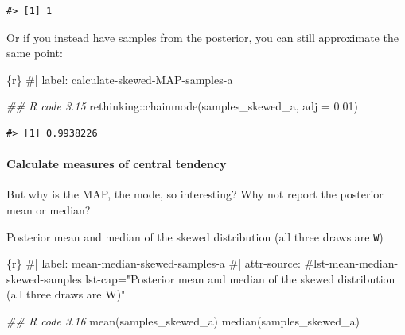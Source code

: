 \documentclass[
  letterpaper,
  DIV=11,
  numbers=noendperiod]{scrreprt}
\let\oldparagraph\paragraph
\renewcommand{\paragraph}[1]{\oldparagraph{#1}\mbox{}}
\newenvironment{Shaded}{\begin{snugshade}}{\end{snugshade}}
\newcommand{\AttributeTok}[1]{\textcolor[rgb]{0.40,0.45,0.13}{#1}}
\newcommand{\CommentTok}[1]{\textcolor[rgb]{0.37,0.37,0.37}{#1}}
\newcommand{\DocumentationTok}[1]{\textcolor[rgb]{0.37,0.37,0.37}{\textit{#1}}}
\newcommand{\FloatTok}[1]{\textcolor[rgb]{0.68,0.00,0.00}{#1}}
\newcommand{\FunctionTok}[1]{\textcolor[rgb]{0.28,0.35,0.67}{#1}}
\newcommand{\InformationTok}[1]{\textcolor[rgb]{0.37,0.37,0.37}{#1}}
\newcommand{\NormalTok}[1]{\textcolor[rgb]{0.00,0.23,0.31}{#1}}
\newcommand{\SpecialCharTok}[1]{\textcolor[rgb]{0.37,0.37,0.37}{#1}}
\begin{document}
\begin{verbatim}
#> [1] 1
\end{verbatim}

Or if you instead have samples from the posterior, you can still
approximate the same point:

\begin{Shaded}
\begin{Highlighting}[]
\InformationTok{\textasciigrave{}\textasciigrave{}\textasciigrave{}\{r\}}
\CommentTok{\#| label: calculate{-}skewed{-}MAP{-}samples{-}a}

\DocumentationTok{\#\# R code 3.15}
\NormalTok{rethinking}\SpecialCharTok{::}\FunctionTok{chainmode}\NormalTok{(samples\_skewed\_a, }\AttributeTok{adj =} \FloatTok{0.01}\NormalTok{)}
\InformationTok{\textasciigrave{}\textasciigrave{}\textasciigrave{}}
\end{Highlighting}
\end{Shaded}

\begin{verbatim}
#> [1] 0.9938226
\end{verbatim}

\hypertarget{calculate-measures-of-central-tendency}{%
\paragraph{Calculate measures of central
tendency}\label{calculate-measures-of-central-tendency}}

But why is the MAP, the mode, so interesting? Why not report the
posterior mean or median?

\begin{codelisting}

\caption{Posterior mean and median of the skewed distribution (all three
draws are \texttt{W})}

\hypertarget{lst-mean-median-skewed-samples}{%
\label{lst-mean-median-skewed-samples}}%
\begin{Shaded}
\begin{Highlighting}[]
\InformationTok{\textasciigrave{}\textasciigrave{}\textasciigrave{}\{r\}}
\CommentTok{\#| label: mean{-}median{-}skewed{-}samples{-}a}
\CommentTok{\#| attr{-}source: \textquotesingle{}\#lst{-}mean{-}median{-}skewed{-}samples lst{-}cap="Posterior mean and median of the skewed distribution (all three draws are \textasciigrave{}W\textasciigrave{})"\textquotesingle{}}

\DocumentationTok{\#\# R code 3.16}
\FunctionTok{mean}\NormalTok{(samples\_skewed\_a)}
\FunctionTok{median}\NormalTok{(samples\_skewed\_a)}
\InformationTok{\textasciigrave{}\textasciigrave{}\textasciigrave{}}
\end{Highlighting}
\end{Shaded}

\end{codelisting}
\end{document}
